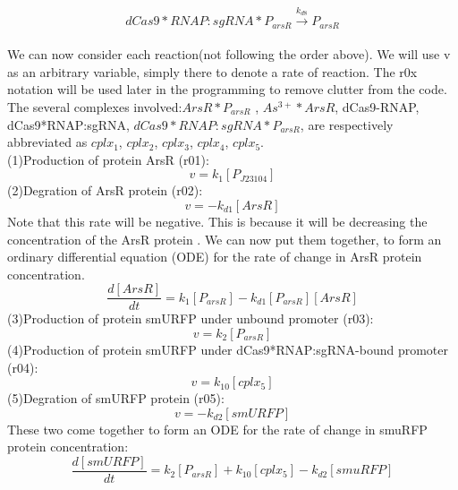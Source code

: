 
\begin{equation}
dCas9*RNAP:sgRNA*P_{arsR}\stackrel{k_{d8}}{\longrightarrow}P_{arsR}
\end{equation}
\\

We can now consider each reaction(not following the order above). We will use v as an arbitrary variable, simply there to denote a rate of reaction. The r0x notation will be used later in the programming to remove clutter from the code. The several complexes involved:$ArsR*P_{arsR}$ , $As^{3+}*ArsR$, dCas9-RNAP, dCas9*RNAP:sgRNA, $dCas9*RNAP:sgRNA*P_{arsR}$, are respectively abbreviated as $cplx_1$, $cplx_2$, $cplx_3$, $cplx_4$, $cplx_5$.\\
(1)Production of protein ArsR (r01):
\begin{displaymath}
v=k_1[P_{J23104}]
\end{displaymath}
(2)Degration of ArsR protein (r02):
\begin{displaymath}
v=-k_{d1}[ArsR]
\end{displaymath}
Note that this rate will be negative. This is because it will be decreasing the concentration of the ArsR protein . We can now put them together, to form an ordinary differential equation (ODE) for the rate of change in ArsR protein concentration.
\begin{equation}
\frac{d[ArsR]}{dt}=k_1[P_{arsR}]-k_{d1}[P_{arsR}][ArsR]\tag{1}
\end{equation}
(3)Production of protein smURFP under unbound promoter (r03):
\begin{displaymath}
v=k_2[P_{arsR}]
\end{displaymath}
(4)Production of protein smURFP under dCas9*RNAP:sgRNA-bound promoter (r04):
\begin{displaymath}
v=k_{10}[cplx_5]
\end{displaymath}
(5)Degration of smURFP protein (r05):
\begin{displaymath}
v=-k_{d2}[smURFP]
\end{displaymath}
These two come together to form an ODE for the rate of change in smuRFP protein concentration:
\begin{equation}
\frac{d[smURFP]}{dt}=k_2[P_{arsR}]+k_{10}[cplx_5]-k_{d2}[smuRFP]\tag{2}
\end{equation}
